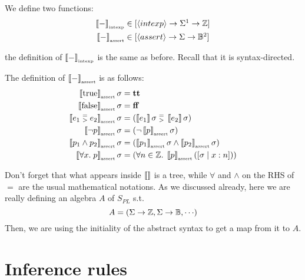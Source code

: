 \begin{enumcirc}
	\item
	We define two functions:
	\begin{align*}
		\intexpsem{-} & \in \brackets{\chevrons{intexp} \rightarrow \Sigma\footnotemark \rightarrow \Z} \\
		\assertsem{-} & \in \brackets{\chevrons{assert} \rightarrow \Sigma \rightarrow \B\footnotemark}
	\end{align*}
	\footnoteeqn{$\braces{\ttt, \fff}$}
	\item
	the definition of $\left\llbracket - \right\rrbracket_{\textrm{\tiny intexp}}$ is the same as before.
	Recall that it is syntax-directed.
	\item
	The definition of $\left\llbracket - \right\rrbracket_{\textrm{\tiny assert}}$ is as follows:
	\begin{align*}
		\left\llbracket \textrm{true} \right\rrbracket_{\textrm{\tiny assert}} \sigma                       & = \textbf{tt}                                                                    \\
		\left\llbracket \textrm{false} \right\rrbracket_{\textrm{\tiny assert}} \sigma                      & = \textbf{ff}                                                                    \\
		\left\llbracket e_1 \;\substack{=\\>}\; e_2 \right\rrbracket_{\textrm{\tiny assert}} \sigma & = \left( \left\llbracket e_1 \right\rrbracket\sigma\; \substack{=\\>}\; \left\llbracket e_2 \right\rrbracket\sigma \right) \\
		\left\llbracket \neg p \right\rrbracket_{\textrm{\tiny assert}} \sigma                      & = \left( \neg \left\llbracket p \right\rrbracket_{\textrm{\tiny assert}}\sigma \right)                                        \\
		\left\llbracket p_1 \wedge p_2 \right\rrbracket_{\textrm{\tiny assert}} \sigma              & = \left( \left\llbracket p_1 \right\rrbracket_{\textrm{\tiny assert}}\sigma \wedge \left\llbracket p_2 \right\rrbracket_{\textrm{\tiny assert}}\sigma \right)              \\
		\left\llbracket \forall x .\; p \right\rrbracket_{\textrm{\tiny assert}} \sigma             & = \left( \forall n \in \mathbb{Z} .\; \left\llbracket p \right\rrbracket_{\textrm{\tiny assert}}\left( \left[ \sigma \; \middle\vert \; x:n \right] \right) \right)
	\end{align*}
	\item
	Don't forget that what appears inside $\left\llbracket  \right\rrbracket$ is a tree, while $\forall$
	and $\wedge$ on the RHS of $=$ are the usual mathematical notations.
	As we discussed already, here we are really defining an algebra $A$ of $S_{PL}$
	s.t.
	\[
		A = \prths{\Sigma \rightarrow \Z, \Sigma \rightarrow \B, \cdots}
	\]
	Then, we are using the initiality of the abstract syntax to get a map from it
	to $A$.

	\section{Inference rules}


\end{enumcirc}
